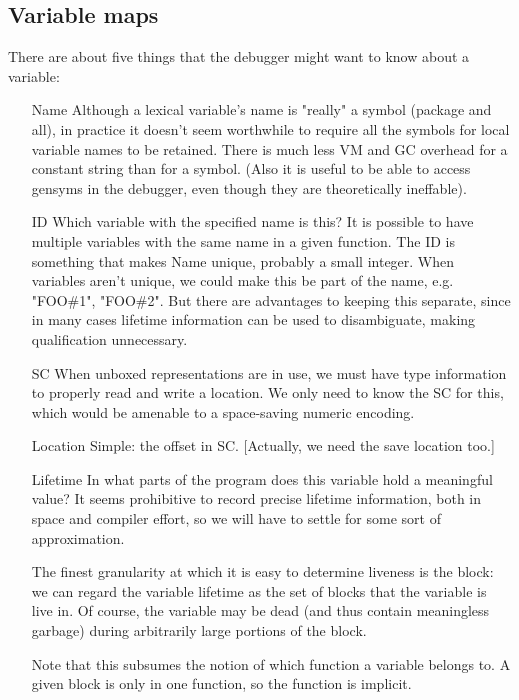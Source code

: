

\subsection{Variable maps}

There are about five things that the debugger might want to know about a
variable:
\begin{itemize}

\item[Name]
	Although a lexical variable's name is "really" a symbol (package and
	all), in practice it doesn't seem worthwhile to require all the symbols
	for local variable names to be retained.  There is much less VM and GC
	overhead for a constant string than for a symbol.  (Also it is useful
	to be able to access gensyms in the debugger, even though they are
	theoretically ineffable).

\item[ID]
	Which variable with the specified name is this?  It is possible to have
	multiple variables with the same name in a given function.  The ID is
	something that makes Name unique, probably a small integer.  When
	variables aren't unique, we could make this be part of the name, e.g.
	"FOO\#1", "FOO\#2".  But there are advantages to keeping this separate,
	since in many cases lifetime information can be used to disambiguate,
	making qualification unnecessary.

\item[SC]
	When unboxed representations are in use, we must have type information
	to properly read and write a location.  We only need to know the
	SC for this, which would be amenable to a space-saving
	numeric encoding.

\item[Location]
	Simple: the offset in SC.  [Actually, we need the save location too.]

\item[Lifetime]
	In what parts of the program does this variable hold a meaningful
	value?  It seems prohibitive to record precise lifetime information,
	both in space and compiler effort, so we will have to settle for some
	sort of approximation.

	The finest granularity at which it is easy to determine liveness is
	the block: we can regard the variable lifetime as the set of blocks
	that the variable is live in.  Of course, the variable may be dead (and
	thus contain meaningless garbage) during arbitrarily large portions of
	the block.

	Note that this subsumes the notion of which function a variable belongs
	to.  A given block is only in one function, so the function is
	implicit.
\end{itemize}

